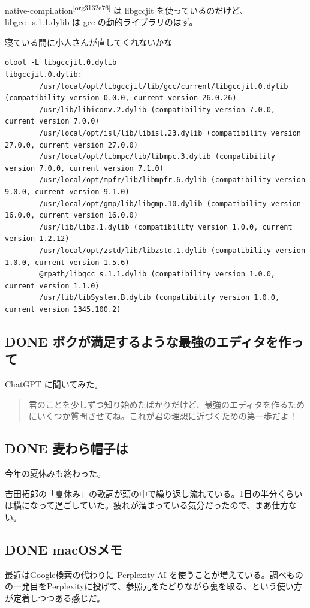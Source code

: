 \documentclass[11pt]{article}
\begin{document}
native-compilation\textsuperscript{\ref{org3132e76}} は libgccjit を使っているのだけど、libgcc\_s.1.1.dylib は gcc の動的ライブラリのはず。

寝ている間に小人さんが直してくれないかな🤔

\begin{verbatim}
otool -L libgccjit.0.dylib
libgccjit.0.dylib:
        /usr/local/opt/libgccjit/lib/gcc/current/libgccjit.0.dylib (compatibility version 0.0.0, current version 26.0.26)
        /usr/lib/libiconv.2.dylib (compatibility version 7.0.0, current version 7.0.0)
        /usr/local/opt/isl/lib/libisl.23.dylib (compatibility version 27.0.0, current version 27.0.0)
        /usr/local/opt/libmpc/lib/libmpc.3.dylib (compatibility  version 7.0.0, current version 7.1.0)
        /usr/local/opt/mpfr/lib/libmpfr.6.dylib (compatibility version 9.0.0, current version 9.1.0)
        /usr/local/opt/gmp/lib/libgmp.10.dylib (compatibility version 16.0.0, current version 16.0.0)
        /usr/lib/libz.1.dylib (compatibility version 1.0.0, current version 1.2.12)
        /usr/local/opt/zstd/lib/libzstd.1.dylib (compatibility version 1.0.0, current version 1.5.6)
        @rpath/libgcc_s.1.1.dylib (compatibility version 1.0.0, current version 1.1.0)
        /usr/lib/libSystem.B.dylib (compatibility version 1.0.0, current version 1345.100.2)
\end{verbatim}
\subsection{{\bfseries\sffamily DONE} ボクが満足するような最強のエディタを作って}
\label{sec:orgb7d0a16}
ChatGPT に聞いてみた。

\begin{quote}
君のことを少しずつ知り始めたばかりだけど、最強のエディタを作るためにいくつか質問させてね。これが君の理想に近づくための第一歩だよ！
\end{quote}
\subsection{{\bfseries\sffamily DONE} 麦わら帽子は}
\label{sec:orgb0633f8}
今年の夏休みも終わった。

吉田拓郎の「夏休み」の歌詞が頭の中で繰り返し流れている。1日の半分くらいは横になって過ごしていた。疲れが溜まっている気分だったので、まあ仕方ない。
\subsection{{\bfseries\sffamily DONE} macOSメモ}
\label{sec:org7b20b2a}
最近はGoogle検索の代わりに \href{https://www.perplexity.ai}{Perplexity AI} を使うことが増えている。調べものの一発目をPerplexityに投げて、参照元をたどりながら裏を取る、という使い方が定着しつつある感じだ。
\end{document}
